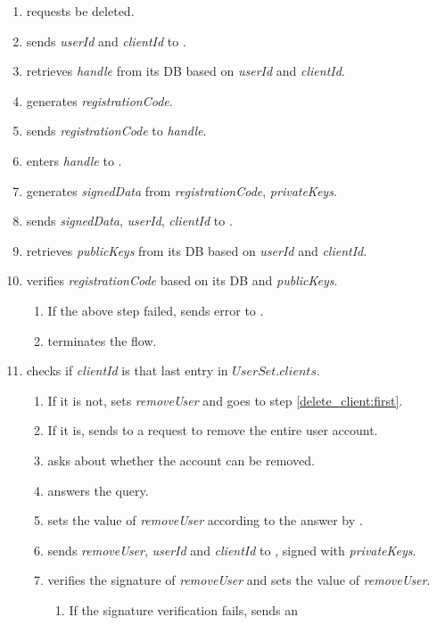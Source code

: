 \documentclass[a4paper,10pt,draft]{article}
\newcommand{\signedData}{\emph{signedData}}
\newcommand{\handle}{\emph{handle}}
\newcommand{\registrationCode}{\emph{registrationCode}}
\newcommand{\privateKeys}{\emph{privateKeys}}
\newcommand{\publicKeys}{\emph{publicKeys}}
\newcommand{\userId}{\emph{userId}}
\newcommand{\clientId}{\emph{clientId}}
\newcommand{\removeUser}{\emph{removeUser}}
\begin{document}
\begin{enumerate}
 \item \User{} requests \Client{} be deleted.
 \item \Client{} sends \userId{} and \clientId{} to \Server{}.
 \item \Server{} retrieves \handle{} from its DB based on \userId{} and 
\clientId{}.
 \item \Server{} generates \registrationCode{}.
 \item \Server{} sends \registrationCode{} to \handle{}.
 \item \User{} enters \handle{} to \Client{}.
 \item \Client{} generates \signedData{} from \registrationCode{}, 
\privateKeys{}.
 \item \Client{} sends \signedData{}, \userId{}, \clientId{} to \Server{}.
 \item \Server{} retrieves \publicKeys{} from its DB based on \userId{} and 
\clientId{}.
 \item \Server{} verifies \registrationCode{} based on its DB and \publicKeys{}.
 \begin{enumerate}
  \item If the above step failed, \Server{} sends error to \Client{}.
  \item \Client{} terminates the flow.
 \end{enumerate}
 \item \Server{} checks if \clientId{} is that last entry in $UserSet.clients$.
 \begin{enumerate}
  \item If it is not, \Server{} sets \removeUser{} and goes to 
step \ref{delete_client:first}.
  \item If it is, \Server{} sends to \Client{} a request to remove the entire 
user account.
  \item \Client{} asks \User{} about whether the account can be removed.
  \item \User{} answers the query.
  \item \Client{} sets the value of \removeUser{} according to the answer by 
\User{}.
  \item{} \Client{} sends \removeUser{}, \userId{} and \clientId{} to 
\Server{}, signed with \privateKeys{}.
  \item{} \Server{} verifies the signature of \removeUser{} and sets the value 
of \removeUser{}.
  \begin{enumerate}
   \item If the signature verification fails, \Server{} sends \Client{} an 

\end{enumerate}
\end{enumerate}
\end{enumerate}
\end{document}

